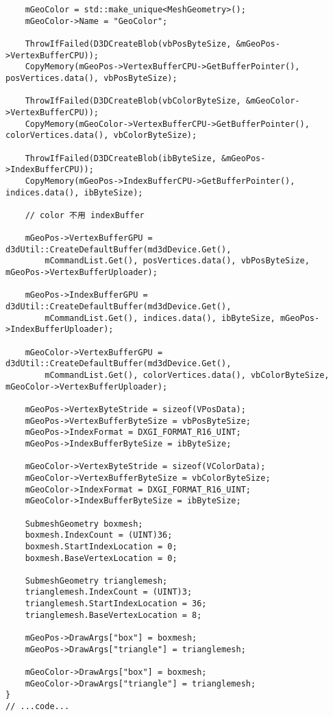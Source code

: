 \begin{lstlisting}
    mGeoColor = std::make_unique<MeshGeometry>();
    mGeoColor->Name = "GeoColor";

    ThrowIfFailed(D3DCreateBlob(vbPosByteSize, &mGeoPos->VertexBufferCPU));
    CopyMemory(mGeoPos->VertexBufferCPU->GetBufferPointer(), posVertices.data(), vbPosByteSize);

    ThrowIfFailed(D3DCreateBlob(vbColorByteSize, &mGeoColor->VertexBufferCPU));
    CopyMemory(mGeoColor->VertexBufferCPU->GetBufferPointer(), colorVertices.data(), vbColorByteSize);

    ThrowIfFailed(D3DCreateBlob(ibByteSize, &mGeoPos->IndexBufferCPU));
    CopyMemory(mGeoPos->IndexBufferCPU->GetBufferPointer(), indices.data(), ibByteSize);

    // color 不用 indexBuffer

    mGeoPos->VertexBufferGPU = d3dUtil::CreateDefaultBuffer(md3dDevice.Get(),
        mCommandList.Get(), posVertices.data(), vbPosByteSize, mGeoPos->VertexBufferUploader);

    mGeoPos->IndexBufferGPU = d3dUtil::CreateDefaultBuffer(md3dDevice.Get(),
        mCommandList.Get(), indices.data(), ibByteSize, mGeoPos->IndexBufferUploader);

    mGeoColor->VertexBufferGPU = d3dUtil::CreateDefaultBuffer(md3dDevice.Get(),
        mCommandList.Get(), colorVertices.data(), vbColorByteSize, mGeoColor->VertexBufferUploader);

    mGeoPos->VertexByteStride = sizeof(VPosData);
    mGeoPos->VertexBufferByteSize = vbPosByteSize;
    mGeoPos->IndexFormat = DXGI_FORMAT_R16_UINT;
    mGeoPos->IndexBufferByteSize = ibByteSize;

    mGeoColor->VertexByteStride = sizeof(VColorData);
    mGeoColor->VertexBufferByteSize = vbColorByteSize;
    mGeoColor->IndexFormat = DXGI_FORMAT_R16_UINT;
    mGeoColor->IndexBufferByteSize = ibByteSize;

    SubmeshGeometry boxmesh;
    boxmesh.IndexCount = (UINT)36;
    boxmesh.StartIndexLocation = 0;
    boxmesh.BaseVertexLocation = 0;

    SubmeshGeometry trianglemesh;
    trianglemesh.IndexCount = (UINT)3;
    trianglemesh.StartIndexLocation = 36;
    trianglemesh.BaseVertexLocation = 8;

    mGeoPos->DrawArgs["box"] = boxmesh;
    mGeoPos->DrawArgs["triangle"] = trianglemesh;

    mGeoColor->DrawArgs["box"] = boxmesh;
    mGeoColor->DrawArgs["triangle"] = trianglemesh;
}
// ...code...
\end{lstlisting}

